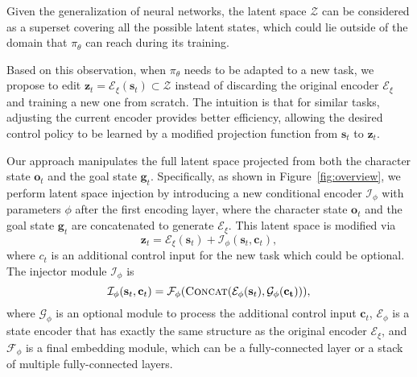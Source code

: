 Given the generalization of neural networks, 
the latent space $\mathcal{Z}$ can be considered as a superset covering all the possible latent states,  
which could lie outside of the domain that $\pi_\theta$ can reach during its training.  

Based on this observation, when $\pi_\theta$ needs to be adapted to a new task, 
we propose to edit  $\mathbf{z}_t = \mathcal{E}_\xi(\mathbf{s}_t) \subset \mathcal{Z}$ instead of discarding the original encoder $\mathcal{E}_\xi$ and training a new one from scratch. The intuition is that for similar tasks, adjusting the current encoder provides %
better efficiency, allowing the desired control policy to be learned by a modified projection function from $\mathbf{s}_t$ to $\mathbf{z}_t$. 




Our approach manipulates %
the full latent space projected from both the character state $\mathbf{o}_t$ and the goal state $\mathbf{g}_t$.
Specifically, as shown in Figure~\ref{fig:overview},
we perform latent space injection by introducing a new conditional encoder $\mathcal{I}_\phi$ with parameters $\phi$ after the first encoding layer, where the character state $\mathbf{o}_t$ and the goal state $\mathbf{g}_t$ are concatenated to generate %
$\mathcal{E}_\xi$. 
This latent space is modified via
\begin{equation}\label{eq:latent_after_injection}
\mathbf{z}_t = \mathcal{E}_\xi(\mathbf{s}_t) + \mathcal{I}_\phi(\mathbf{s}_t, \mathbf{c}_t), 
\end{equation}
where $c_t$ is an additional control input for the new task which could be optional.
The %
injector module $\mathcal{I}_\phi$ is %
\begin{equation}\label{eq:injection_component}
    \mathcal{I}_\phi(\mathbf{s}_t, \mathbf{c}_t) = \mathcal{F}_\phi(\textsc{Concat}(\mathcal{E}_\phi(\mathbf{s}_t), \mathcal{G}_\phi(\mathbf{c_t}))),
\end{equation}
where $\mathcal{G}_\phi$ is an optional module to process the additional control input $\mathbf{c}_t$, $\mathcal{E}_\phi$ is a state encoder that has exactly the same structure as the original encoder $\mathcal{E}_\xi$, and $\mathcal{F}_\phi$ is a final embedding module, which can be a fully-connected layer 
or a stack of multiple fully-connected layers. 


